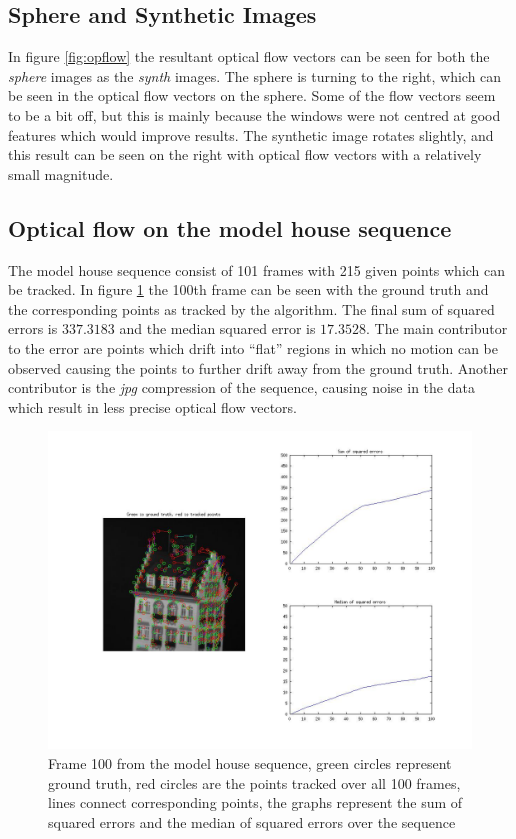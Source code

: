 \documentclass[a4paper,10pt]{article}
\begin{document}
\subsection{Sphere and Synthetic Images}
In figure \ref{fig:opflow} the resultant optical flow vectors can be seen for both the \emph{sphere} images as the \emph{synth} images. The sphere is turning to the right, which can be seen in the optical flow vectors on the sphere. Some of the flow vectors seem to be a bit off, but this is mainly because the windows were not centred at good features which would improve results. The synthetic image rotates slightly, and this result can be seen on the right with optical flow vectors with a relatively small magnitude.



\subsection{Optical flow on the model house sequence}
The model house sequence consist of 101 frames with 215 given points which can be tracked. In figure \ref{fig:modelhouse} the 100th frame can be seen with the ground truth and the corresponding points as tracked by the algorithm. The final sum of squared errors is $337.3183$ and the median squared error is $17.3528$. The main contributor to the error are points which drift into ``flat'' regions in which no motion can be observed causing the points to further drift away from the ground truth. Another contributor is the \emph{jpg} compression of the sequence, causing noise in the data which result in less precise optical flow vectors.

\begin{figure}[h!tb]
\includegraphics[width=1\textwidth]{frame00000100}
\caption{Frame 100 from the model house sequence, green circles represent ground truth, red circles are the points tracked over all 100 frames, lines connect corresponding points, the graphs represent the sum of squared errors and the median of squared errors over the sequence }
\label{fig:modelhouse}
\end{figure}
\end{document}
